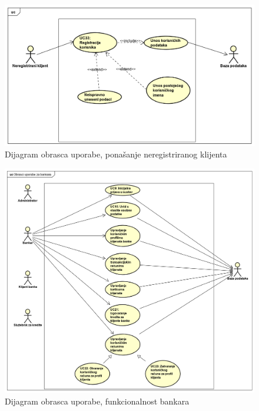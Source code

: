 		        \begin{figure}[H]
		        	\includegraphics[scale=0.6]{slike/UseCase NeregKlijent Marko.png}
		        	\centering
		        	\caption{Dijagram obrasca uporabe, ponašanje neregistriranog klijenta}
		        	\label{fig:neregistrirani_klijent}
		        \end{figure}
				\begin{figure}[H]
					\includegraphics[scale=0.5]{slike/UseCase Diagram0Matija.PNG}
					\centering
					\caption{Dijagram obrasca uporabe, funkcionalnost bankara}
					\label{fig:ucd0Matija}
				\end{figure}
			
